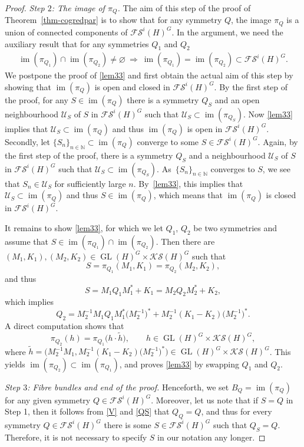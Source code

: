 \documentclass[pdftex]{sigma}
\numberwithin{equation}{section}
\theoremstyle{definition}
\DeclareMathOperator{\im}{im}
\DeclareMathOperator{\GL}{GL}
\begin{document}
\begin{proof}
{\it Step $2$: The image of $\pi_Q$.}
The aim of this step of the proof of Theorem~\ref{thm-cogredpar} is to show that for any symmetry $Q$, the image $\pi_Q$ is a union of connected components of $\mathcal{FS}^i(H)^G$. In the argument, we need the auxiliary result that for any symmetries $Q_1$ and $Q_2$
\begin{align}\label{lem33}
\im(\pi_{Q_1})\cap \im(\pi_{Q_2})\neq\varnothing \ \Longrightarrow \ \im(\pi_{Q_1})=\im(\pi_{Q_2})\subset\mathcal{FS}^i(H)^G.
\end{align}
We postpone the proof of \eqref{lem33} and first obtain the actual aim of this step by showing that $\im(\pi_Q)$ is open and closed in $\mathcal{FS}^i(H)^G$. By the first step of the proof, for any $S\in\im(\pi_Q)$ there is a symmetry $Q_S$ and an open neighbourhood $\mathcal{U}_S$ of $S$ in $\mathcal{FS}^i(H)^G$ such that $\mathcal{U}_S\subset\im(\pi_{Q_S})$. Now \eqref{lem33} implies that $\mathcal{U}_S\subset\im(\pi_Q)$ and thus $\im(\pi_Q)$ is open in $\mathcal{FS}^i(H)^G$. Secondly, let $\{S_n\}_{n\in\mathbb{N}}\subset\im(\pi_Q)$ converge to some $S\in\mathcal{FS}^i(H)^G$. Again, by the first step of the proof, there is a symmetry $Q_S$ and a neighbourhood $\mathcal{U}_S$ of $S$ in $\mathcal{FS}^i(H)^G$ such that $\mathcal{U}_S\subset\im(\pi_{Q_S})$. As~$\{S_n\}_{n\in\mathbb{N}}$ converges to $S$, we see that $S_n\in\mathcal{U}_S$ for sufficiently large $n$. By~\eqref{lem33}, this implies that $\mathcal{U}_S\subset\im(\pi_Q)$ and thus $S\in\im(\pi_Q)$, which means that $\im(\pi_Q)$ is closed in $\mathcal{FS}^i(H)^G$.

It remains to show \eqref{lem33}, for which we let $Q_1$, $Q_2$ be two symmetries and assume that $S\in \im(\pi_{Q_1})\cap \im(\pi_{Q_2})$. Then there are $(M_1,K_1), (M_2,K_2)\in\GL(H)^G\times\mathcal{KS}(H)^G$ such that
\[S=\pi_{Q_1}(M_1,K_1)=\pi_{Q_2}(M_2,K_2),\]
and thus
\[S=M_1Q_1M^\ast_1+K_1=M_2Q_2M^\ast_2+K_2,\]
which implies
\[Q_2=M^{-1}_2M_1Q_1M^\ast_1\bigl(M^{-1}_2\bigr)^\ast+M^{-1}_2(K_1-K_2)\bigl(M^{-1}_2\bigr)^\ast.\]
A direct computation shows that
\[\pi_{Q_2}(h)=\pi_{Q_1}\bigl(h\cdot \tilde{h}\bigr),\qquad h\in \GL(H)^G\times\mathcal{KS}(H)^G,\]
where $\tilde{h}=\bigl(M^{-1}_2M_1,M^{-1}_2(K_1-K_2)\bigl(M^{-1}_2\bigr)^\ast\bigr)\in \GL(H)^G\times\mathcal{KS}(H)^G$. This yields $\im(\pi_{Q_2})\subset\im(\pi_{Q_1})$, and proves \eqref{lem33} by swapping $Q_1$ and $Q_2$.

{\it Step $3$: Fibre bundles and end of the proof.}
Henceforth, we set $B_Q=\im(\pi_Q)$ for any given symmetry $Q\in\mathcal{FS}^i(H)^G$. Moreover, let us note that if $S=Q$ in Step 1, then it follows from \eqref{V} and \eqref{QS} that $Q_Q=Q$, and thus for every symmetry $Q\in\mathcal{FS}^i(H)^G$ there is some $S\in\mathcal{FS}^i(H)^G$ such that $Q_S=Q$. Therefore, it is not necessary to specify $S$ in our notation any longer.


\end{proof}
\end{document}
